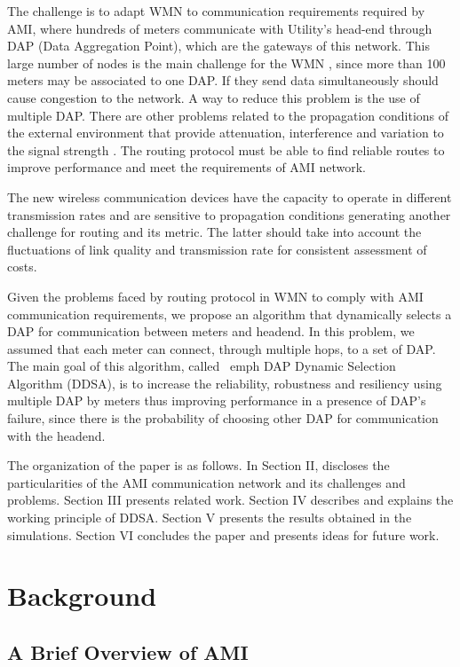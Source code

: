 \documentclass[conference]{IEEEtran}
\begin{document}
The challenge is to adapt WMN to communication requirements required by AMI, where hundreds of meters communicate with Utility's head-end through DAP (Data Aggregation Point), which are the gateways of this network. This large number of nodes is the main challenge for the WMN \cite{Akyildiz2005}, since more than 100 meters may be associated to one DAP. If they  send data simultaneously should cause congestion to the network. A way to reduce this problem is the use of multiple DAP. There are other problems related to the propagation conditions of the external environment that provide attenuation, interference and variation to the signal strength \cite{Gungor2011}. The routing protocol must be able to find reliable routes to improve performance and meet the requirements of AMI network.

The new wireless communication devices have the capacity to operate in different transmission rates and are sensitive to propagation conditions generating another challenge for routing and its metric. The latter should take into account the fluctuations of link quality and transmission
rate for consistent assessment of costs.

Given the problems faced by routing protocol in WMN to comply with AMI communication requirements, we propose an algorithm that dynamically selects a DAP for communication between meters and headend. In this problem, we assumed that each meter can connect, through multiple hops, to a set of DAP. The main goal of this algorithm, called \ emph {DAP} Dynamic Selection Algorithm (DDSA), is to increase the reliability, robustness and resiliency using multiple DAP by meters thus improving performance in a presence of DAP's failure, since there is the probability of choosing other DAP for communication with the headend.

The organization of the paper is as follows. In Section II, discloses the particularities of the AMI communication network and its challenges and problems. Section III presents related work. Section IV describes and explains the working principle of DDSA. Section V presents the results obtained in the simulations. Section VI concludes the paper and presents ideas for future work.



\section{Background}

\subsection{A Brief Overview of AMI}
\end{document}
